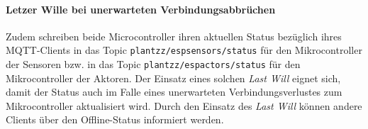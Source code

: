 \paragraph{Letzer Wille bei unerwarteten Verbindungsabbrüchen}

Zudem schreiben beide Microcontroller ihren aktuellen Status bezüglich ihres MQTT-Clients in das Topic \texttt{plantzz/espsensors/status} für den Mikrocontroller der Sensoren bzw. in das Topic \texttt{plantzz/espactors/status} für den Mikrocontroller der Aktoren. Der Einsatz eines solchen \textit{Last Will} eignet sich, damit der Status auch im Falle eines unerwarteten Verbindungsverlustes zum Mikrocontroller aktualisiert wird. Durch den Einsatz des \textit{Last Will} können andere Clients über den Offline-Status informiert werden.